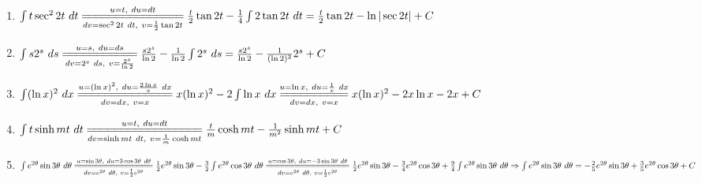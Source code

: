 \documentclass[a4]{article}
\begin{document}
\begin{enumerate}[label={\bf{}\arabic*}.]
\item%
	$\int t\sec^22t\ dt\overset{u=t,\ du=dt}{\underset{dv=\sec^22t\ dt,\ v=\frac{1}{2}\tan2t}{=\joinrel=\joinrel=\joinrel=\joinrel=\joinrel=\joinrel=\joinrel=\joinrel=\joinrel=\joinrel=\joinrel=\joinrel=\joinrel=\joinrel=}}\frac{t}{2}\tan2t-\frac{1}{4}\int2\tan2t\ dt=\frac{t}{2}\tan2t-\ln|\sec2t|+C$

\item%
	$\int s2^s\ ds\overset{u=s,\ du=ds}{\underset{dv=2^s\ ds,\ v=\frac{2^s}{\ln2}}{=\joinrel=\joinrel=\joinrel=\joinrel=\joinrel=\joinrel=\joinrel=\joinrel=\joinrel=\joinrel=}}\frac{s2^s}{\ln2}-\frac{1}{\ln2}\int2^s\ ds=\frac{s2^s}{\ln2}-\frac{1}{(\ln2)^2}2^s+C$

\item%
	$\int(\ln x)^2\ dx\overset{u=(\ln x)^2,\ du=\frac{2\ln x}{x}\ dx}{\underset{dv=dx,\ v=x}{=\joinrel=\joinrel=\joinrel=\joinrel=\joinrel=\joinrel=\joinrel=\joinrel=\joinrel=\joinrel=\joinrel=\joinrel=\joinrel=}}x(\ln x)^2-2\int\ln x\ dx\overset{u=\ln x,\ du=\frac{1}{x}\ dx}{\underset{dv=dx,\ v=x}{=\joinrel=\joinrel=\joinrel=\joinrel=\joinrel=\joinrel=\joinrel=\joinrel=\joinrel=}}x(\ln x)^2-2x\ln x-2x+C$

\item%
	$\int t\sinh mt\ dt\overset{u=t,\ du=dt}{\underset{dv=\sinh mt\ dt,\ v=\frac{1}{m}\cosh mt}{=\joinrel=\joinrel=\joinrel=\joinrel=\joinrel=\joinrel=\joinrel=\joinrel=\joinrel=\joinrel=\joinrel=\joinrel=\joinrel=\joinrel=\joinrel=\joinrel=}}\frac{t}{m}\cosh mt-\frac{1}{m^2}\sinh mt+C$

\item%
	$\int e^{2\theta}\sin3\theta\ d\theta\overset{u=\sin3\theta,\ du=3\cos3\theta\ d\theta}{\underset{dv=e^{2\theta}\ d\theta,\ v=\frac{1}{2}e^{2\theta}}{=\joinrel=\joinrel=\joinrel=\joinrel=\joinrel=\joinrel=\joinrel=\joinrel=\joinrel=\joinrel=\joinrel=\joinrel=\joinrel=\joinrel=}}\frac{1}{2}e^{2\theta}\sin3\theta-\frac{3}{2}\int e^{2\theta}\cos3\theta\ d\theta\overset{u=\cos3\theta,\ du=-3\sin3\theta\ d\theta}{\underset{dv=e^{2\theta}\ d\theta,\ v=\frac{1}{2}e^{2\theta}}{=\joinrel=\joinrel=\joinrel=\joinrel=\joinrel=\joinrel=\joinrel=\joinrel=\joinrel=\joinrel=\joinrel=\joinrel=\joinrel=\joinrel=\joinrel=}}\frac{1}{2}e^{2\theta}\sin3\theta-\frac{3}{4}e^{2\theta}\cos3\theta+\frac{9}{4}\int e^{2\theta}\sin3\theta\ d\theta\Rightarrow\int e^{2\theta}\sin3\theta\ d\theta=-\frac{2}{5}e^{2\theta}\sin3\theta+\frac{3}{5}e^{2\theta}\cos3\theta+C$


\end{enumerate}
\end{document}
